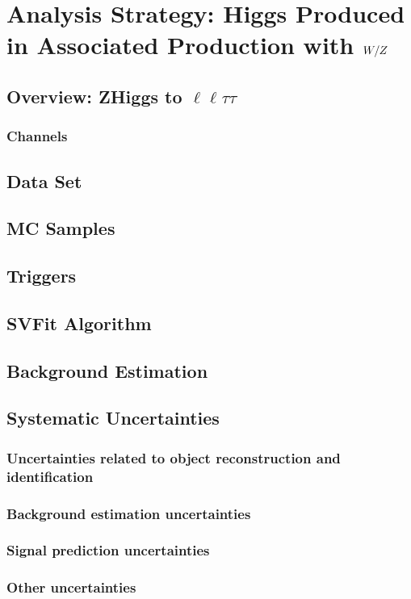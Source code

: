 \chapter{Analysis Strategy: Higgs Produced in Associated Production with $W/Z$}
\label{sec:vh_analysis}

\section{Overview: ZHiggs to $\ell\ell\tau\tau$}
\subsection{Channels}
\section{Data Set}
\section{MC Samples}
\section{Triggers}
\section{SVFit Algorithm}
\section{Background Estimation}
\section{Systematic Uncertainties}
\subsection{Uncertainties related to object reconstruction and identification}
\subsection{Background estimation uncertainties}
\subsection{Signal prediction uncertainties}
\subsection{Other uncertainties}
